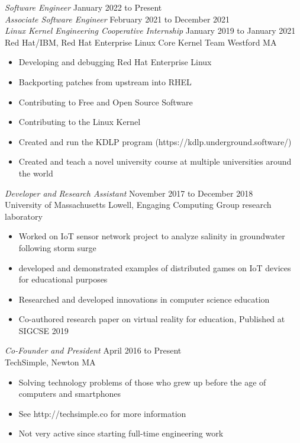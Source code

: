 \documentclass[margin]{res}
\begin{document}
\begin{resume}
{\sl Software Engineer}
\hfill January 2022 to Present \\
{\sl Associate Software Engineer}
\hfill February 2021 to December 2021 \\
{\sl Linux Kernel Engineering Cooperative Internship}
\hfill January 2019 to January 2021\\
Red Hat/IBM, 
Red Hat Enterprise Linux Core Kernel Team Westford MA
\begin{itemize} \itemsep -2pt
	\item Developing and debugging Red Hat Enterprise Linux
        \item Backporting patches from upstream into RHEL
	\item Contributing to Free and Open Source Software
	\item Contributing to the Linux Kernel
	\item Created and run the KDLP program (https://kdlp.underground.software/)
        \item Created and teach a novel university course at multiple universities around the world
\end{itemize}

{\sl Developer and Research Assistant}
\hfill November 2017 to December 2018 \\
University of Massachusetts Lowell,
Engaging Computing Group research laboratory
\begin{itemize} \itemsep -2pt
	\item Worked on IoT sensor network project to analyze salinity in
		groundwater following storm surge
	\item developed and demonstrated examples of distributed games on
		IoT devices for educational purposes
	\item Researched and developed innovations in computer science
		education
	\item Co-authored research paper on virtual reality for education,
		Published at SIGCSE 2019
\end{itemize} 
{\sl Co-Founder and President}
\hfill April 2016 to Present \\
TechSimple,
Newton MA
\begin{itemize} \itemsep -2pt
	\item Solving technology problems of those who grew up before the age
		of computers and smartphones
	\item See http://techsimple.co for more information
        \item Not very active since starting full-time engineering work
\end{itemize} 

\end{resume}
\end{document}
